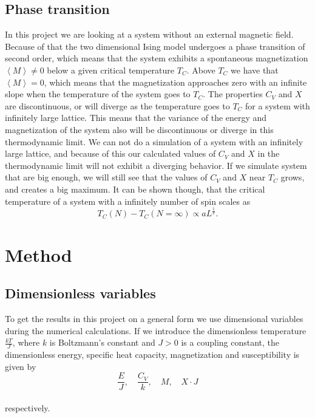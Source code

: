 \documentclass[12pt]{article}
\begin{document}
\begin{flushleft}
\subsection{Phase transition}
In this project we are looking at a system without an external magnetic field. Because of that the two dimensional Ising model undergoes a phase transition of second order, which means that the system exhibits a spontaneous magnetization $\left<M\right> \neq 0$ below a given critical temperature $T_C$. Above $T_C$ we have that $\left<M\right> = 0$, which means that the magnetization approaches zero with an infinite slope when the temperature of the system goes to $T_C$. The properties $C_V$ and $X$ are discontinuous, or will diverge as the temperature goes to $T_C$ for a system with infinitely large lattice. This means that the variance of the energy and magnetization of the system also will be discontinuous or diverge in this thermodynamic limit. We can not do a simulation of a system with an infinitely large lattice, and because of this our calculated values of $C_V$ and $X$ in the thermodynamic limit will not exhibit a diverging behavior. If we simulate system that are big enough, we will still see that the values of $C_V$ and $X$ near $T_C$ grows, and creates a big maximum. It can be shown though, that the critical temperature of a system with a infinitely number of spin scales as
\vspace{5mm}
\begin{equation}\label{eq:propto_TC}
T_C(N) -T_C(N = \infty) \propto aL^{\frac{1}{\nu}}.
\end{equation}
\vspace{5mm}



\newpage
\section{Method}
\subsection{Dimensionless variables}
To get the results in this project on a general form we use dimensional variables during the numerical calculations. If we introduce the dimensionless temperature $\frac{kT}{J}$, where $k$ is Boltzmann's constant and $J>0$ is a coupling constant, the dimensionless energy, specific heat capacity, magnetization and susceptibility is given by
\vspace{5mm}
$$\frac{E}{J},\quad \frac{C_V}{k},\quad M,\quad X\cdot J$$\\
\vspace{5mm}
respectively.

\end{flushleft}
\end{document}
